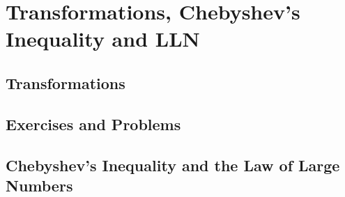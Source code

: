 \section{Transformations, Chebyshev's Inequality and LLN}

\subsection{Transformations}

\subsection{Exercises and Problems}

\subsection{Chebyshev's Inequality and the Law of Large Numbers}